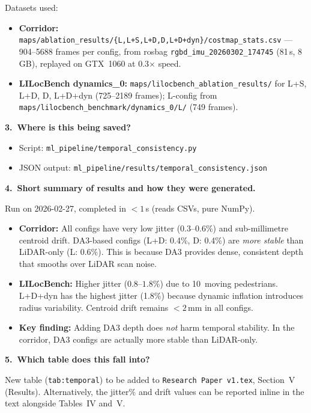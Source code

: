 \documentclass[11pt,a4paper]{article}
\begin{document}
Datasets used:
\begin{itemize}[nosep]
  \item \textbf{Corridor:}
    \texttt{maps/ablation\_results/\{L,L+S,L+D,D,L+D+dyn\}/costmap\_stats.csv}
    --- 904--5688 frames per config, from rosbag
    \texttt{rgbd\_imu\_20260302\_174745} (81\,s, 8\,GB), replayed on
    GTX~1060 at 0.3$\times$ speed.
  \item \textbf{LILocBench dynamics\_0:}
    \texttt{maps/lilocbench\_ablation\_results/} for L+S, L+D, D, L+D+dyn
    (725--2189 frames); L-config from
    \texttt{maps/lilocbench\_benchmark/dynamics\_0/L/} (749 frames).
\end{itemize}

\textbf{3.\ Where is this being saved?}

\begin{itemize}[nosep]
  \item Script: \texttt{ml\_pipeline/temporal\_consistency.py}
  \item JSON output: \texttt{ml\_pipeline/results/temporal\_consistency.json}
\end{itemize}

\textbf{4.\ Short summary of results and how they were generated.}

Run on 2026-02-27, completed in $< 1$\,s (reads CSVs, pure NumPy).

\begin{itemize}[nosep]
  \item \textbf{Corridor:} All configs have very low jitter
    ($0.3$--$0.6$\%) and sub-millimetre centroid drift.
    DA3-based configs (L+D: 0.4\%, D: 0.4\%) are \emph{more stable}
    than LiDAR-only (L: 0.6\%). This is because DA3 provides dense,
    consistent depth that smooths over LiDAR scan noise.
  \item \textbf{LILocBench:} Higher jitter ($0.8$--$1.8$\%) due to
    10~moving pedestrians. L+D+dyn has the highest jitter (1.8\%)
    because dynamic inflation introduces radius variability.
    Centroid drift remains $< 2$\,mm in all configs.
  \item \textbf{Key finding:} Adding DA3 depth does \emph{not} harm
    temporal stability. In the corridor, DA3 configs are actually
    more stable than LiDAR-only.
\end{itemize}

\textbf{5.\ Which table does this fall into?}

New table (\texttt{tab:temporal}) to be added to
\texttt{Research Paper v1.tex}, Section~V (Results).
Alternatively, the jitter\% and drift values can be reported inline
in the text alongside Tables~IV and~V.
\end{document}

